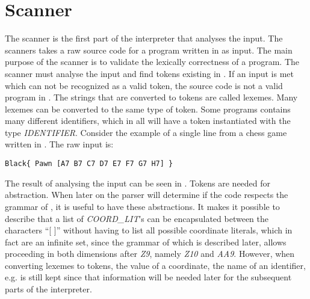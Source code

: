 \section{Scanner}
The scanner is the first part of the interpreter that analyses the input. The scanners takes a raw source code for a program written in \productname{} as input. The main purpose of the scanner is to validate the lexically correctness of a \productname{} program. The scanner must analyse the input and find tokens existing in \productname{}. If an input is met which can not be recognized as a valid token, the source code is not a valid program in \productname{}. The strings that are converted to tokens are called lexemes. Many lexemes can be converted to the same type of token. Some programs contains many different identifiers, which in \productname{} all will have a token instantiated with the type \textit{IDENTIFIER}. Consider the example of a single line from a chess game written in \productname{}. The raw input is:
\begin{lstlisting}
Black{ Pawn [A7 B7 C7 D7 E7 F7 G7 H7] }
\end{lstlisting}
The result of analysing the input can be seen in . Tokens are needed for abstraction. When later on the parser will determine if the code respects the grammar of \productname{}, it is useful to have these abstractions. It makes it possible to describe that a list of \textit{COORD\_LIT}'s can be encapsulated between the characters ``[ ]'' without having to list all possible coordinate literals, which in fact are an infinite set, since the grammar of \productname{} which is described later, allows proceeding in both dimensions after \textit{Z9}, namely \textit{Z10} and \textit{AA9}. However, when converting lexemes to tokens, the value of a coordinate, the name of an identifier, e.g. is still kept since that information will be needed later for the subsequent parts of the interpreter.

